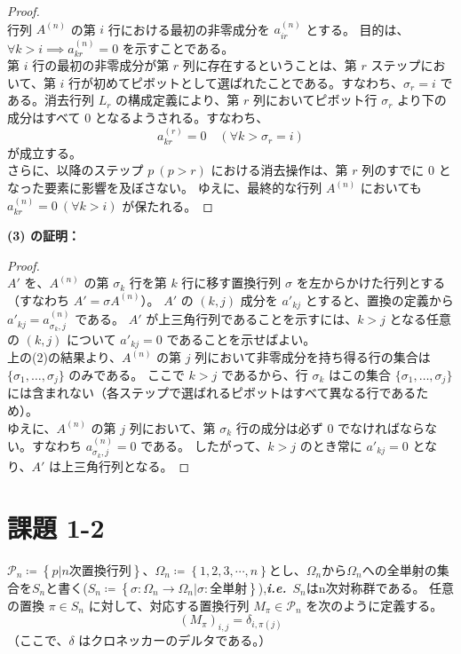 \documentclass[dvipdfmx,a4paper]{jsarticle} %
\makeatletter
\newcommand*{\ie}{\textbf{\textit{i.e.}}\@\xspace} %
\theoremstyle{mystyle}                       %
\makeatother
\begin{document}
\begin{proof}\ \\
\noindent
行列 $A^{(n)}$ の第 $i$ 行における最初の非零成分を $a^{(n)}_{ir}$ とする。
目的は、$\forall k > i \implies a^{(n)}_{kr} = 0$ を示すことである。\\

\noindent
第 $i$ 行の最初の非零成分が第 $r$ 列に存在するということは、第 $r$ ステップにおいて、第 $i$ 行が初めてピボットとして選ばれたことである。すなわち、$ \sigma_r = i $
である。消去行列 $L_r$ の構成定義により、第 $r$ 列においてピボット行 $\sigma_r$ より下の成分はすべて $0$ となるようされる。すなわち、
$$ a^{(r)}_{kr} = 0 \quad (\forall k > \sigma_r = i) $$
が成立する。\\

\noindent
さらに、以降のステップ $p \ (p > r)$ における消去操作は、第 $r$ 列のすでに $0$ となった要素に影響を及ぼさない。
ゆえに、最終的な行列 $A^{(n)}$ においても $a^{(n)}_{kr} = 0 \ (\forall k > i)$ が保たれる。

\end{proof}
\vspace{1em}
\noindent
\textbf{(3) の証明：}

\begin{proof}\ \\
\noindent
$A'$ を、$A^{(n)}$ の第 $\sigma_k$ 行を第 $k$ 行に移す置換行列 $\sigma$ を左からかけた行列とする（すなわち $A' = \sigma A^{(n)}$）。
$A'$ の $(k, j)$ 成分を $a'_{kj}$ とすると、置換の定義から $a'_{kj} = a^{(n)}_{\sigma_k, j}$ である。
$A'$ が上三角行列であることを示すには、$k > j$ となる任意の $(k, j)$ について $a'_{kj} = 0$ であることを示せばよい。\\

\noindent
上の(2)の結果より、$A^{(n)}$ の第 $j$ 列において非零成分を持ち得る行の集合は $\{\sigma_1, \dots, \sigma_j\}$ のみである。
ここで $k > j$ であるから、行 $\sigma_k$ はこの集合 $\{\sigma_1, \dots, \sigma_j\}$ には含まれない（各ステップで選ばれるピボットはすべて異なる行であるため）。\\

\noindent
ゆえに、$A^{(n)}$ の第 $j$ 列において、第 $\sigma_k$ 行の成分は必ず $0$ でなければならない。すなわち $a^{(n)}_{\sigma_k, j} = 0$ である。
したがって、$k > j$ のとき常に $a'_{kj} = 0$ となり、$A'$ は上三角行列となる。
\end{proof}
\vspace{2em}

\section*{\textbf{\large 課題 1-2}\quad \normalfont\large}
\noindent
$\mathscr{P}_{n}\coloneqq \left\{p| n次置換行列\right\}$、$\Omega_n\coloneqq \left\{1,2,3,\cdots,n\right\}$とし、$\Omega_n$から$\Omega_n$への全単射の集合を$S_n$と書く($S_n \coloneqq \left\{\sigma: \Omega_n\to \Omega_n|\sigma: 全単射\right\}$),\ie \ $S_n$はn次対称群である。
任意の置換 $\pi \in S_n$ に対して、対応する置換行列 $M_\pi \in \mathscr{P}_n$ を次のように定義する。
$$(M_\pi)_{i,j} = \delta_{i, \pi(j)}$$
（ここで、$\delta$ はクロネッカーのデルタである。）
\end{document}
